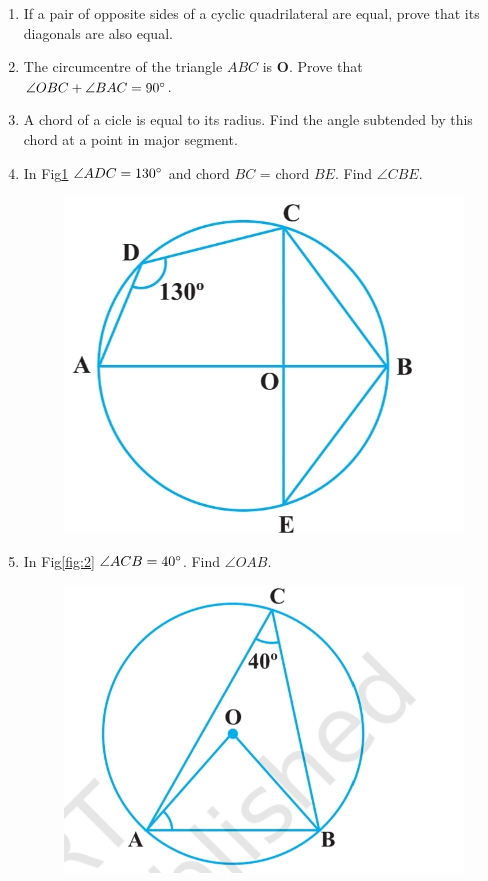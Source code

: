 \documentclass[12pt]{article}
\let\vec\mathbf
\begin{document}
\begin{enumerate}
\item If a pair of opposite sides of a cyclic quadrilateral are equal, prove that its diagonals are also equal.
\item The circumcentre of the triangle ${ABC}$ is $\vec{O}$. Prove that $\angle OBC + \angle BAC = 90\degree$.
\item A chord of a cicle is equal to its radius. Find the angle subtended by this chord at a point in major segment.
\item In Fig\ref{fig:1} $\angle ADC  = 130\degree$ and chord $BC$ = chord $BE$. Find $\angle CBE$.
\begin{figure}[h!]
   \includegraphics[width=\columnwidth]{figs/image1.jpg}
\caption{}
\label{fig:1}
\end{figure}
\item In Fig\ref{fig:2} $\angle ACB = 40\degree$. Find $\angle OAB $.
\begin{figure}[h!]
   \includegraphics[width=\columnwidth]{figs/image2.jpg}

\end{figure}
\end{enumerate}
\end{document}
